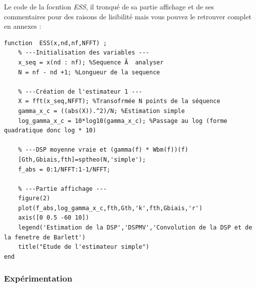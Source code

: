\documentclass{article}
\begin{document}
Le code de la focntion \textit{ESS}, il tronqué de sa partie affichage et de ses commentaires pour des raisons de lisibilité mais vous pouvez le retrouver complet en annexes : 
\begin{verbatim}
function  ESS(x,nd,nf,NFFT) ;
    % ---Initialisation des variables ---
    x_seq = x(nd : nf); %Sequence Ã  analyser
    N = nf - nd +1; %Longueur de la sequence
    
    % ---Création de l'estimateur 1 ---
    X = fft(x_seq,NFFT); %Transofrmée N points de la séquence  
    gamma_x_c = ((abs(X)).^2)/N; %Estimation simple
    log_gamma_x_c = 10*log10(gamma_x_c); %Passage au log (forme quadratique donc log * 10)
    
    % ---DSP moyenne vraie et (gamma(f) * Wbm(f))(f)
    [Gth,Gbiais,fth]=sptheo(N,'simple');
    f_abs = 0:1/NFFT:1-1/NFFT;
    
    % ---Partie affichage ---
    figure(2)
    plot(f_abs,log_gamma_x_c,fth,Gth,'k',fth,Gbiais,'r')
    axis([0 0.5 -60 10])
    legend('Estimation de la DSP','DSPMV','Convolution de la DSP et de la fenetre de Barlett')
    title("Etude de l'estimateur simple")
end
\end{verbatim}

\newpage
\subsubsection{Expérimentation}
\end{document}
